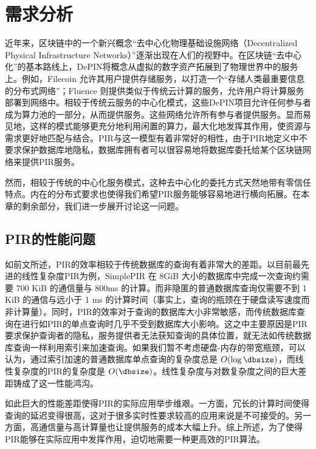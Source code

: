 \section{需求分析}

近年来，区块链中的一个新兴概念“去中心化物理基础设施网络（Decentralized Physical Infrastructure Networks）”逐渐出现在人们的视野中。在区块链“去中心化”的基本路线上，DePIN将概念从虚拟的数字资产拓展到了物理世界中的服务上。例如，Filecoin \cite{filecoin} 允许其用户提供存储服务，以打造一个“存储人类最重要信息的分布式网络”；Fluence \cite{fluence} 则提供类似于传统云计算的服务，允许用户将计算服务部署到网络中。相较于传统云服务的中心化模式，这些DePIN项目允许任何参与者成为算力池的一部分，从而提供服务。这些网络允许所有参与者提供服务。显而易见地，这样的模式能够更充分地利用闲置的算力，最大化地发挥其作用，使资源与需求更好地匹配与结合。PIR与这一模型有着非常好的相性，由于PIR地定义中不要求保护数据库地隐私，数据库拥有者可以很容易地将数据库委托给某个区块链网络来提供PIR服务。

然而，相较于传统的中心化服务模式，这种去中心化的委托方式天然地带有零信任特点。内在的分布式要求也使得我们希望PIR服务能够容易地进行横向拓展。在本章的剩余部分，我们进一步展开讨论这一问题。
\subsection{PIR的性能问题}
如前文所述，PIR的效率相较于传统数据库的查询有着非常大的差距。以目前最先进的线性复杂度PIR为例，SimplePIR \cite{SimplePIR} 在 8GiB 大小的数据库中完成一次查询约需要 700 KiB 的通信量与 800ms 的计算。而非隐匿的普通数据库查询仅需要不到 1 KiB 的通信与远小于 1 ms 的计算时间（事实上，查询的瓶颈在于硬盘读写速度而非计算量）。同时，PIR的效率对于查询的数据库大小非常敏感，而传统数据库查询在进行如PIR的单点查询时几乎不受到数据库大小影响。这之中主要原因是PIR要求保护查询者的隐私，服务提供者无法获知查询的具体位置，就无法如传统数据库查询一样利用索引来加速查询。如果我们暂不考虑硬盘-内存的带宽瓶颈，可以认为，通过索引加速的普通数据库单点查询的复杂度总是 $O(\log\dbsize)$，而线性复杂度的PIR的复杂度是 $O(\dbsize)$。线性复杂度与对数复杂度之间的巨大差距铸成了这一性能鸿沟。

如此巨大的性能差距使得PIR的实际应用举步维艰。一方面，冗长的计算时间使得查询的延迟变得很高，这对于很多实时性要求较高的应用来说是不可接受的。另一方面，高通信量与高计算量也让提供服务的成本大幅上升。综上所述，为了使得PIR能够在实际应用中发挥作用，迫切地需要一种更高效的PIR算法。

